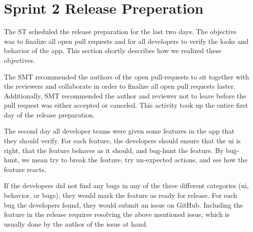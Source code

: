\section{Sprint 2 Release Preperation}
The \gls{ST} scheduled the release preparation for the last two days. The objective was to finalize all open pull requests and for all developers to verify the looks and behavior of the app. This section shortly describes how we realized these objectives.

The \gls{SMT} recommended the authors of the open pull-requests to sit together with the reviewers and collaborate in order to finalize all open pull requests faster. Additionally, \gls{SMT} recommended the author and reviewer not to leave before the pull request was either accepted or canceled. This activity took up the entire first day of the release preparation.

The second day all developer teams were given some features in the app that they should verify. For each feature, the developers should ensure that the \gls{ui} is right, that the feature behaves as it should, and bug-hunt the feature. By bug-hunt, we mean try to break the feature, try un-expected actions, and see how the feature reacts.

If the developers did not find any bugs in any of the three different categories (\gls{ui}, behavior, or bugs), they would mark the feature as ready for release. For each bug the developers found, they would submit an issue on GitHub. Including the feature in the release requires resolving the above mentioned issue, which is usually done by the author of the issue at hand.